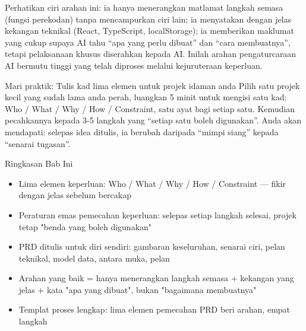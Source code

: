 Perhatikan ciri arahan ini: ia hanya menerangkan matlamat langkah semasa (fungsi perekodan) tanpa mencampurkan ciri lain; ia menyatakan dengan jelas kekangan teknikal (React, TypeScript, localStorage); ia memberikan maklumat yang cukup supaya AI tahu “apa yang perlu dibuat” dan “cara membuatnya”, tetapi pelaksanaan khusus diserahkan kepada AI. Inilah arahan pengaturcaraan AI bermutu tinggi yang telah diproses melalui kejuruteraan keperluan.

\begin{tcbpractice}{Mari praktik: Tulis kad lima elemen untuk projek idaman anda}
Pilih satu projek kecil yang sudah lama anda perah, luangkan 5 minit untuk mengisi satu kad: Who / What / Why / How / Constraint, satu ayat bagi setiap satu. Kemudian pecahkannya kepada 3-5 langkah yang “setiap satu boleh digunakan”. Anda akan mendapati: selepas idea ditulis, ia berubah daripada “mimpi siang” kepada “senarai tugasan”.

\end{tcbpractice}

\begin{tcbsummary}{Ringkasan Bab Ini}
\begin{itemize}
  \item Lima elemen keperluan: Who / What / Why / How / Constraint — fikir dengan jelas sebelum bercakap
  \item Peraturan emas pemecahan keperluan: selepas setiap langkah selesai, projek tetap "benda yang boleh digunakan"
  \item PRD ditulis untuk diri sendiri: gambaran keseluruhan, senarai ciri, pelan teknikal, model data, antara muka, pelan
  \item Arahan yang baik = hanya menerangkan langkah semasa + kekangan yang jelas + kata "apa yang dibuat", bukan "bagaimana membuatnya"
  \item Templat proses lengkap: lima elemen pemecahan PRD beri arahan, empat langkah
\end{itemize}

\end{tcbsummary}
